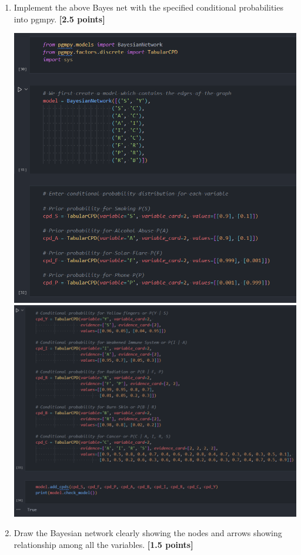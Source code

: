 \item
\begin{enumerate}
  \item Implement the above Bayes net with the specified conditional probabilities into pgmpy. {\bf [2.5 points]}
        \begin{center}
          \includegraphics[scale=0.5]{"./Diagrams/Q3 Code Page 1.PNG"}
          \includegraphics[scale=0.5]{"./Diagrams/Q3 Code Page 2.PNG"}
        \end{center}
        \clearpage
  \item Draw the Bayesian network clearly showing the nodes and arrows showing relationship among all the variables. {\bf [1.5 points]}
        \begin{center}
          \begin{tikzpicture}[->,>=stealth,auto,node distance=0cm,
              thick,main node/.style={circle,draw}, minimum size=1cm]


\end{tikzpicture}
\end{center}
\end{enumerate}
